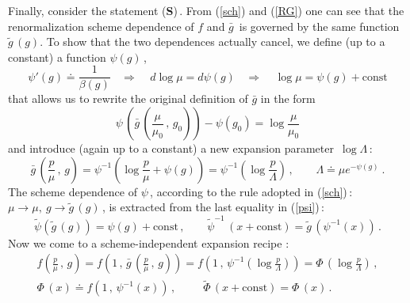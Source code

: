 \documentclass[a4paper,12pt]{article}
\begin{document}
Finally, consider the statement (\textbf{S})\,. From (\ref{sch})
and (\ref{RG}) one can see that the renormalization scheme dependence
of $f$ and $\bar g$\, is governed by the same function $\tilde g\,(g)$.
To show that the two dependences actually cancel, we define
(up to a constant) a function $\psi(g)$\,,
\begin{equation}
\label{psi}
\psi'(g) \doteq \frac{1}{\beta(g)} \ \ \ \ \Longrightarrow \ \ \ \ \
d\log\mu = d\psi(g) \ \ \ \ \Longrightarrow \ \ \ \ \
\log\mu = \psi(g) + \text{const}
\end{equation}
that allows us to rewrite the original definition of $\bar g$ in the form
\begin{equation}
\label{}
\psi\,(\bar{g}\,(\frac{\mu}{\mu_0}\,,\,g_0)) - \psi(g_0)
 = \log\frac{\mu}{\mu_0}
\end{equation}
and introduce (again up to a constant) a new expansion parameter\,
$\log\Lambda$\,:
\begin{equation}
\label{Lambda}
\bar{g}\,(\frac{p}{\mu}\,,\,g) = \psi^{-1}(\log\frac{p}{\mu} + \psi(g))
 = \psi^{-1}(\log\frac{p}{\Lambda})\,, \ \ \ \ \ \ \ \ \
 \Lambda \doteq \mu e^{-\psi(g)}\ .
\end{equation}
The scheme dependence of $\psi$\,, according to the rule adopted in
(\ref{sch})\,: $\mu\rightarrow\mu, \ g\rightarrow\tilde g\,(g)$\,,
is extracted from the last equality in (\ref{psi})\,:
\begin{equation}
\label{psi1}
\tilde\psi(\tilde g\,(g)) = \psi(g) + \text{const}\,, \ \ \ \ \ \ \ \ \
\tilde\psi^{-1}\,(x + \text{const}) = \tilde g\,(\psi^{-1}(x))\,.
\end{equation}
Now we come to a scheme-independent expansion recipe \cite{Vl}:
\begin{gather}
\label{indep}
f(\frac{p}{\mu}\,,\,g) = f(1\,,\,\bar{g}\,(\frac{p}{\mu}\,,\,g))
 = f(1\,,\,\psi^{-1}(\log\frac{p}{\Lambda}))
 = \Phi\,(\log\frac{p}{\Lambda})\,, \\
\label{Phi}
\Phi\,(x) \doteq f(1\,,\,\psi^{-1}(x))\,, \ \ \ \ \ \ \ \ \ \ \
\tilde\Phi\,(x + \text{const}) = \Phi\,(x)\,.
\end{gather}
\end{document}
